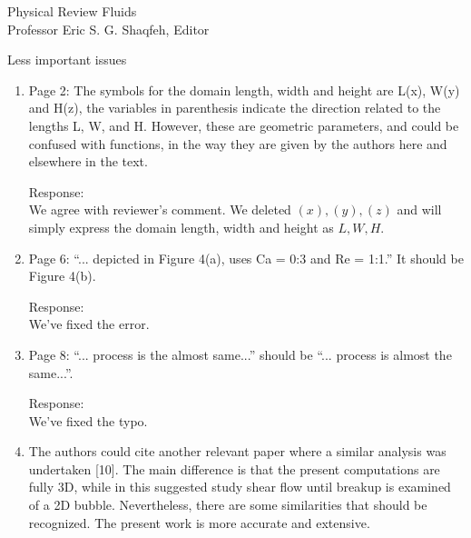 \documentclass{letter}
\begin{document}
\begin{letter}{
Physical Review Fluids\\
Professor Eric S. G. Shaqfeh, Editor\\}
\begin{enumerate}
\end{enumerate}

Less important issues
\begin{enumerate}

\item
\textsf
{Page 2: The symbols for the domain length, width and height are L(x), W(y) and H(z), the variables in parenthesis indicate the direction related 
to the lengths L, W, and H. However, these are geometric parameters, and could be confused with functions, in the way they are given by the 
authors here and elsewhere in the text.\\
}
\vspace{5 mm}

Response: \\
We agree with reviewer's comment. We deleted $(x), (y), (z)$ and will simply
express the domain length, width and height as $L, W, H$.\\

\par\noindent
\item
\textsf
{Page 6: “... depicted in Figure 4(a), uses Ca = 0:3 and Re = 1:1.” It should be Figure 4(b).\\
}
\vspace{5 mm}

Response: \\
We've fixed the error.\\

\par\noindent
\item
\textsf
{Page 8: “... process is the almost same...” should be “... process is almost the same...”.\\
}
\vspace{5 mm}

Response: \\
We've fixed the typo.\\

\par\noindent
\item
\textsf
{The authors could cite another relevant paper where a similar analysis was undertaken [10]. 
The main difference is that the present computations are fully 3D, while in this suggested study shear 
flow until breakup is examined of a 2D bubble. Nevertheless, there are some similarities 
that should be recognized. The present work is more accurate and extensive.\\
}
\vspace{5 mm}


\end{enumerate}
\end{letter}
\end{document}
